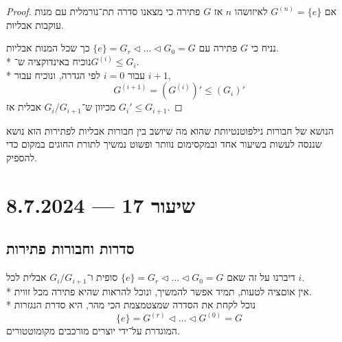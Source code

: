 \begin{proof}
	אם $G^{(n)} = \{e\}$ לאיזושהו $n$ אז $G$ פתירה כי מצאנו סדרה תת־נורמלית עם מנות עוקבות אבליות.

	נניח כי $G$ פתירה עם $\{e\} = G_r \triangleleft \dots \triangleleft G_0 = G$ כך שכל המנות אבליות. \\*
	נוכיח באינדוקציה ש־$G^{(i)} \le G_i$. \\*
	עבור $i = 0$ לפי הגדרה, ונוכיח עבור $i + 1$,
	\[
		G^{(i + 1)} = (G^{(i)})' \le (G_i)'
	\]
	מכיוון ש־$G_i / G_{i + 1}$ אבלית אז $G_i' \le G_{i + 1}$.
\end{proof}
הנושא של חבורות נילפוטנטיותת שהוא מה שיושב בין חבורות אבליות לפתירות הוא נושא שננסה לעשות בשיעור אחד ובמקסימום נוותר ופשוט נמשיך לתורת החוגים במקום כדי להספיק.

\section{שיעור 17 --- 8.7.2024}
\subsection{סדרות וחבורות פתירות}
דיברנו על זה שאם $\{ e \} = G_r \triangleleft \dots \triangleleft G_0 = G$ סופית ו־$G_i / G_{i + 1}$ אבלית לכל $i$. \\*
אין אוםציה לטעות, תמיד אפשר להמשיך, ונוכל להראות שהיא פתירה מכל זווית. \\*
נוכל לקחת את הסדרה שמצטמצמת הכי מהר, היא סדרת הנגזרות
\[
	\{ e \} = G^{(r)} \triangleleft \dots \triangleleft G^{(0)} = G
\]
המוגדרת על־ידי יוצרים מורכבים מקומוטטורים.

